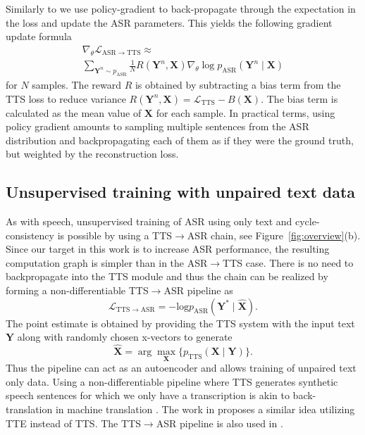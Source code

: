\documentclass[a4paper]{article}
\begin{document}
Similarly to \cite{hori2018cycle} we use policy-gradient to back-propagate through the expectation in the loss and update the ASR parameters. This yields the following gradient update formula
\begin{multline}
\nabla_\theta\mathcal{L}_{\mathrm{ASR\to TTS}} \approx \\ \sum_{\mathbf{Y}^n \sim p_{\mathrm{ASR}}} \frac{1}{N}R(\mathbf{Y}^n, \mathbf{X}) \nabla_\theta \log p_{\mathrm{ASR}}(\mathbf{Y}^n\mid\mathbf{X})
\label{REINFORCE}
\end{multline}
for $N$ samples. The reward $R$ is obtained by subtracting a bias term from the TTS loss to reduce variance $R(\mathbf{Y}^n, \mathbf{X}) = \mathcal{L}_{\mathrm{TTS}} - B(\mathbf{X})$. The bias term is calculated as the mean value of $\mathbf{X}$ for each sample. In practical terms, using policy gradient amounts to sampling multiple sentences from the ASR distribution and backpropagating each of them as if they were the ground truth, but weighted by the reconstruction loss. 

\subsection{Unsupervised training with unpaired text data}

As with speech, unsupervised training of ASR using only text and cycle-consistency is possible by using a TTS$\rightarrow$ASR chain, see Figure~\ref{fig:overview}(b). Since our target in this work is to increase ASR performance, the resulting computation graph is simpler than in the ASR$\rightarrow$TTS case. There is no need to backpropagate into the TTS module and thus the chain can be realized by forming a non-differentiable TTS$\rightarrow$ASR pipeline as
\begin{equation}
\mathcal{L}_{\mathrm{TTS}\rightarrow\mathrm{ASR}}= -\mbox{log}p_{\mathrm{ASR}}(\mathbf{Y}^{*}\mid \hat{\mathbf{X}}).\label{eq:11}
\end{equation}
The point estimate is obtained by providing the TTS system with the input text $\mathbf{Y}$ along with randomly chosen x-vectors to generate
\begin{equation}
\hat{\mathbf{X}} = \arg\max_{\mathbf{X}}\{p_{\mathrm{TTS}}(\mathbf{X}\mid \mathbf{Y})\}.
\end{equation}
Thus the pipeline can act as an autoencoder and allows training of unpaired text only data. Using a non-differentiable pipeline where TTS generates synthetic speech sentences for which we only have a transcription is akin to back-translation in machine translation \cite{sennrich2015improving}. The work in \cite{hayashi2018back} proposes a similar idea utilizing TTE instead of TTS. The TTS$\rightarrow$ASR pipeline is also used in \cite{tjandra2017listening}.
\end{document}
